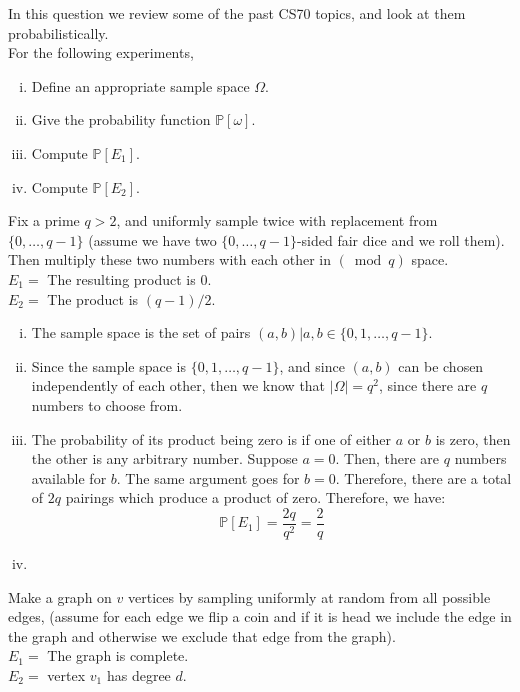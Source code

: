 \documentclass[11pt]{article}
\begin{document}
\pagebreak
{}
In this question we review some of the past CS70 topics, and look at them probabilistically.\\
For the following experiments,
\begin{enumerate}[i.]
\item Define an appropriate sample space $\Omega$.
\item Give the probability function $\mathbb P[\omega]$.
\item Compute $\mathbb P[E_1]$.
\item Compute $\mathbb P[E_2]$.
\end{enumerate}
\begin{Parts}
    \Part Fix a prime $q>2$, and uniformly sample twice with replacement from
    $\{0, \dots, q-1\}$ (assume we have two $\{0, \dots, q-1\}$-sided fair dice and we roll them). Then multiply these two numbers with each other in
    $(\bmod{q})$ space.\\
    $E_1 =$ The resulting product is $0$.\\
    $E_2 =$ The product is $(q-1)/2$.

    \begin{solution}
      \begin{enumerate}[i.]
        \item The sample space is the set of pairs $(a, b) | a, b \in \{0, 1, \dots, q-1\}$. 
        \item Since the sample space is $\{0, 1, \dots, q-1\}$, and since $(a, b)$ can be chosen independently of each other, then we know that $|\Omega| = q^2$, since there are $q$ numbers to choose from.
        \item The probability of its product being zero is if one of either $a$ or $b$ is zero, then the other is any arbitrary number. Suppose $a = 0$. Then, there are $q$ numbers available for $b$. The same argument goes for $b = 0$. Therefore, there are a total of $2q$ pairings which produce a product of zero. Therefore, we have: 
        \[ \mathbb P[E_1] = \frac{2q}{q^2} = \frac{2}{q}\]
        \item 
      \end{enumerate}
    \end{solution}

    \Part Make a graph on $v$ vertices by sampling uniformly at random from all possible edges, (assume for each edge we flip a coin and if it is head we include the edge in the graph and otherwise we exclude that edge from the graph).\\
    $E_1 =$ The graph is complete.\\
    $E_2 =$ vertex $v_1$ has degree $d$.


\end{Parts}
\end{document}
